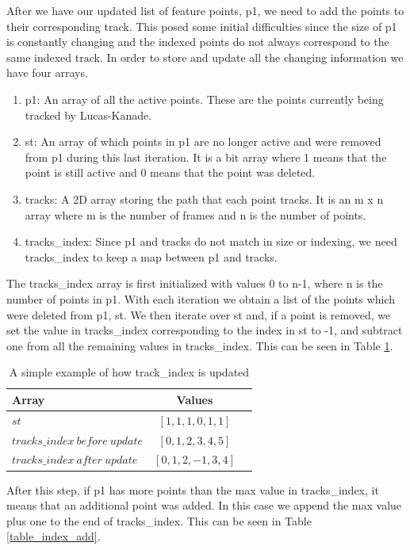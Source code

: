 \documentclass[12pt, onecolumn, conference]{IEEEtran}
\begin{document}
After we have our updated list of feature points, p1, we need to add the points to their corresponding track. This posed some initial difficulties since the size of p1 is constantly changing and the indexed points do not always correspond to the same indexed track. In order to store and update all the changing information we have four arrays.

\begin{enumerate}
\item p1: An array of all the active points. These are the points currently being tracked by Lucas-Kanade.
\item st: An array of which points in p1 are no longer active and were removed from p1 during this last iteration. It is a bit array where 1 means that the point is still active and 0 means that the point was deleted.
\item tracks: A 2D array storing the path that each point tracks. It is an m x n array where m is the number of frames and n is the number of points.
\item tracks\_index: Since p1 and tracks do not match in size or indexing, we need tracks\_index to keep a map between p1 and tracks.
\end{enumerate}

The tracks\_index array is first initialized with values 0 to n-1, where n is the number of points in p1. With each iteration we obtain a list of the points which were deleted from p1, st. We then iterate over st and, if a point is removed, we set the value in tracks\_index corresponding to the index in st to -1, and subtract one from all the remaining values in tracks\_index. This can be seen in Table \ref{table_index}.

\begin{table}[!t]
\caption{A simple example of how track\_index is updated}
\label{table_index}
\centering
\begin{tabular}{ | l | c | r | }
 \hline
 Array & Values\\
  \hline                 
  $st$ & $[1, 1, 1, 0, 1, 1]$\\
  $tracks\_index\ before\ update$ & $[0, 1, 2, 3, 4, 5]$ \\
  $tracks\_index\ after\ update$ & $[0, 1, 2, -1, 3, 4]$ \\
  \hline  
\end{tabular}
\end{table}

After this step, if p1 has more points than the max value in tracks\_index, it means that an additional point was added. In this case we append the max value plus one to the end of tracks\_index. This can be seen in Table \ref{table_index_add}.
\end{document}
